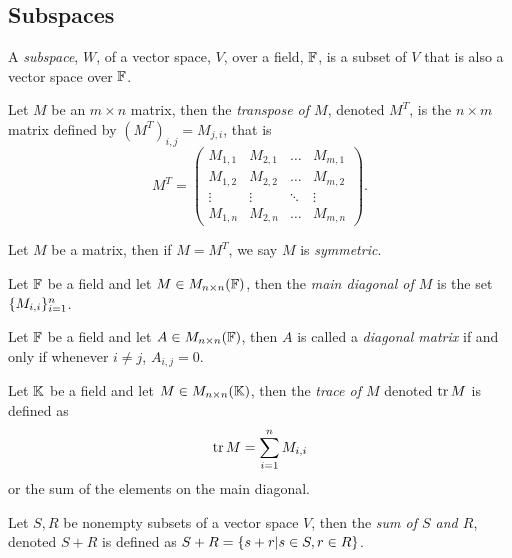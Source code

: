 \pagebreak

\subsection{Subspaces}

\begin{definition}[Subspace]
	A \textit{subspace}, $W$, of a vector space, $V$, over a field, $\mathbb{F}$, is a subset of $V$ that is also a vector space over $\mathbb{F}$.
\end{definition}

\begin{definition}
	Let $M$ be an $m\times n$ matrix, then the \textit{transpose of $M$}, denoted $M^T$, is the $n\times m$ matrix defined by $(M^T)_{i,j}=M_{j,i}$, that is
	\[
		M^T=
		\begin{pmatrix}
			M_{1,1} & M_{2,1} & \ldots & M_{m,1}\\
			M_{1,2} & M_{2,2} & \ldots & M_{m,2}\\
			\vdots & \vdots & \ddots & \vdots\\
			M_{1,n} & M_{2,n} & \ldots & M_{m,n}
		\end{pmatrix}.
	\]
\end{definition}

\begin{definition}
	Let $M$ be a matrix, then if $M=M^T$, we say $M$ is \textit{symmetric}.
\end{definition}

\begin{definition}
	Let $\mathbb{F}$ be a field and let $M\in M_{n\times n}(\mathbb{F})$, then the \textit{main diagonal of $M$} is the set $\lbrace M_{i,i} \rbrace_{i=1}^n$.
\end{definition}

\begin{definition}
	Let $\mathbb{F}$ be a field and let $A\in M_{n\times n}(\mathbb{F})$, then $A$ is called a \textit{diagonal matrix} if and only if whenever $i\neq j$, $A_{i,j}=0$.
\end{definition}

\begin{definition}
	Let $\mathbb{K}$ be a field and let $M\in M_{n\times n}(\mathbb{K})$, then the \textit{trace of $M$} denoted $\operatorname{tr} M$ is defined as
	\[
		\operatorname{tr} M = \sum_{i=1}^n M_{i,i}
	\]
	or the sum of the elements on the main diagonal.
\end{definition}

\begin{definition}
	Let $S,R$ be nonempty subsets of a vector space $V$, then the \textit{sum of $S$ and $R$}, denoted $S+R$ is defined as $S+R=\lbrace s+r|s\in S, r\in R \rbrace$.
\end{definition}
